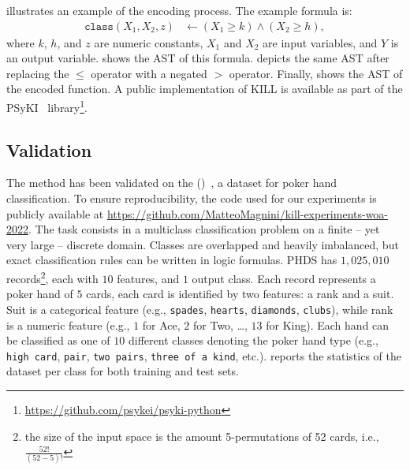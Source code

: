  illustrates an example of the encoding process.
%
The example formula is:
%
\begin{align*}
    \texttt{class}(X_1, X_2, z) &\leftarrow (X_1 \geq k) \land (X_2 \geq h),
\end{align*}
%
where \(k\), \(h\), and \(z\) are numeric constants, \(X_1\) and \(X_2\) are input variables, and \(Y\) is an output variable.
%
 shows the \gls{AST} of this formula.
%
 depicts the same \gls{AST} after replacing the \(\leq\) operator with a negated \(>\) operator.
%
Finally,  shows the \gls{AST} of the encoded function.
%
A public implementation of \gls{KILL} is available as part of the \gls{PSyKI}~\cite{DBLP:conf/atal/MagniniCO22} library\footnote{\label{foot:psyki}\url{https://github.com/psykei/psyki-python}}.


\subsection{Validation}\label{subsec:kill-validation}
%

%
The method has been validated on the  ()~\cite{poker_hand_158}, a dataset for poker hand classification.
%
To ensure reproducibility, the code used for our experiments is publicly available at \url{https://github.com/MatteoMagnini/kill-experiments-woa-2022}.
%
The task consists in a multiclass classification problem on a finite -- yet very large -- discrete domain.
%
Classes are overlapped and heavily imbalanced, but exact classification rules can be written in logic formulas.
%
\Gls{PHDS} has $1,025,010$ records\footnote{the size of the input space is the amount 5-permutations of 52 cards, i.e., $\frac{52!}{(52 - 5)!}$}, each with $10$ features, and $1$ output class.
%
Each record represents a poker hand of $5$ cards, each card is identified by two features: a rank and a suit.
%
Suit is a categorical feature (e.g., \texttt{spades}, \texttt{hearts}, \texttt{diamonds}, \texttt{clubs}), while rank is a numeric feature (e.g., $1$ for Ace, $2$ for Two, \dots, $13$ for King).
%
Each hand can be classified as one of $10$ different classes denoting the poker hand type (e.g., \texttt{high card}, \texttt{pair}, \texttt{two pairs}, \texttt{three of a kind}, etc.).
%
 reports the statistics of the dataset per class for both training and test sets.


